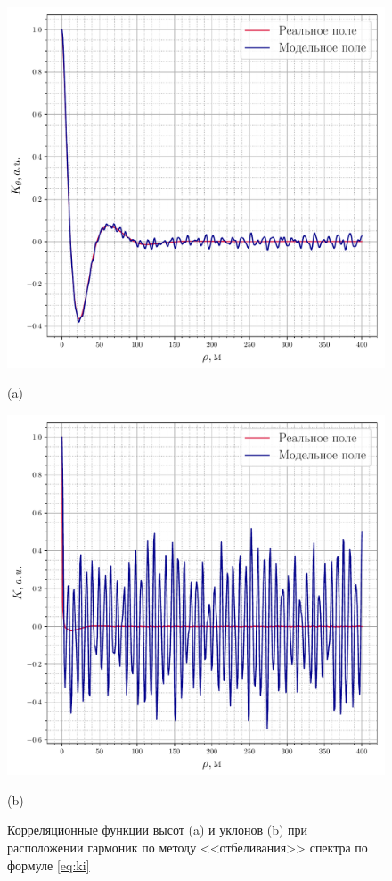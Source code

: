 \documentclass[a4paper,14pt]{extarticle}
\begin{document}
\begin{figure}[h!]
    \centering
    \begin{minipage}{0.49\linewidth}
        \centering
        \includegraphics[width=\linewidth]{fig/correlation_height_height2}


        (a)
    \end{minipage}
    \begin{minipage}{0.49\linewidth}
        \centering
        \includegraphics[width=\linewidth]{fig/correlation_angles_height2}



        (b)
    \end{minipage}

    \caption{ Корреляционные функции высот (a) и уклонов (b) при расположении гармоник
    по методу <<отбеливания>> спектра по формуле \eqref{eq:ki} }
    \label{fig:ki}
\end{figure}
\end{document}
